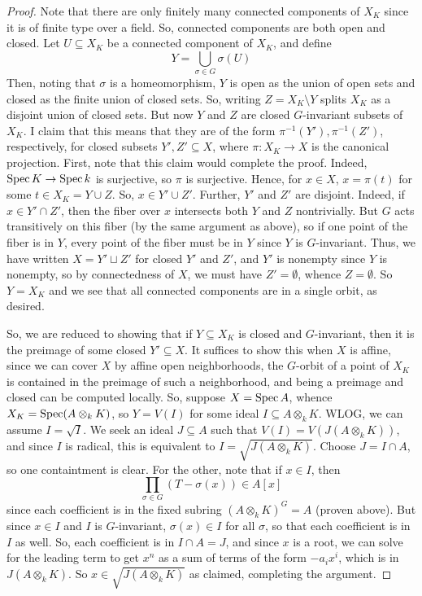 \begin{proof}
	Note that there are only finitely many connected components of $X_K$ since it is of finite type over a field. So, connected components are both open and closed. Let $U \subseteq X_K$ be a connected component of $X_K$, and define
	\[ Y = \bigcup_{\sigma \in G} \sigma(U) \]
	Then, noting that $\sigma$ is a homeomorphism, $Y$ is open as the union of open sets and closed as the finite union of closed sets. So, writing $Z = X_K \setminus Y$ splits $X_K$ as a disjoint union of closed sets. But now $Y$ and $Z$ are closed $G$-invariant subsets of $X_K$. I claim that this means that they are of the form $\pi^{-1}(Y'),\pi^{-1}(Z')$, respectively, for closed subsets $Y',Z' \subseteq X$, where $\pi : X_K \to X$ is the canonical projection. First, note that this claim would complete the proof. Indeed, $\operatorname{Spec} K \to \operatorname{Spec} k$ is surjective, so $\pi$ is surjective. Hence, for $x \in X$, $x = \pi(t)$ for some $t \in X_K = Y \cup Z$. So, $x \in Y' \cup Z'$. Further, $Y'$ and $Z'$ are disjoint. Indeed, if $x \in Y' \cap Z'$, then the fiber over $x$ intersects both $Y$ and $Z$ nontrivially. But $G$ acts transitively on this fiber (by the same argument as above), so if one point of the fiber is in $Y$, every point of the fiber must be in $Y$ since $Y$ is $G$-invariant. Thus, we have written $X = Y' \sqcup Z'$ for closed $Y'$ and $Z'$, and $Y'$ is nonempty since $Y$ is nonempty, so by connectedness of $X$, we must have $Z' = \emptyset$, whence $Z = \emptyset$. So $Y = X_K$ and we see that all connected components are in a single orbit, as desired.
	
	So, we are reduced to showing that if $Y \subseteq X_K$ is closed and $G$-invariant, then it is the preimage of some closed $Y' \subseteq X$. It suffices to show this when $X$ is affine, since we can cover $X$ by affine open neighborhoods, the $G$-orbit of a point of $X_K$ is contained in the preimage of such a neighborhood, and being a preimage and closed can be computed locally. So, suppose $X = \operatorname{Spec} A$, whence $X_K = \operatorname{Spec}(A \otimes_k K)$, so $Y = V(I)$ for some ideal $I \subseteq A \otimes_k K$. WLOG, we can assume $I = \sqrt{I}$. We seek an ideal $J \subseteq A$ such that $V(I) = V(J(A \otimes_k K))$, and since $I$ is radical, this is equivalent to $I = \sqrt{J(A \otimes_k K)}$. Choose $J = I \cap A$, so one containtment is clear. For the other, note that if $x \in I$, then
	\[ \prod_{\sigma \in G} (T - \sigma(x)) \in A[x] \]
	since each coefficient is in the fixed subring $(A \otimes_k K)^G = A$ (proven above). But since $x \in I$ and $I$ is $G$-invariant, $\sigma(x) \in I$ for all $\sigma$, so that each coefficient is in $I$ as well. So, each coefficient is in $I \cap A = J$, and since $x$ is a root, we can solve for the leading term to get $x^n$ as a sum of terms of the form $-a_ix^i$, which is in $J(A \otimes_k K)$. So $x \in \sqrt{J(A \otimes_k K)}$ as claimed, completing the argument.
\end{proof}
